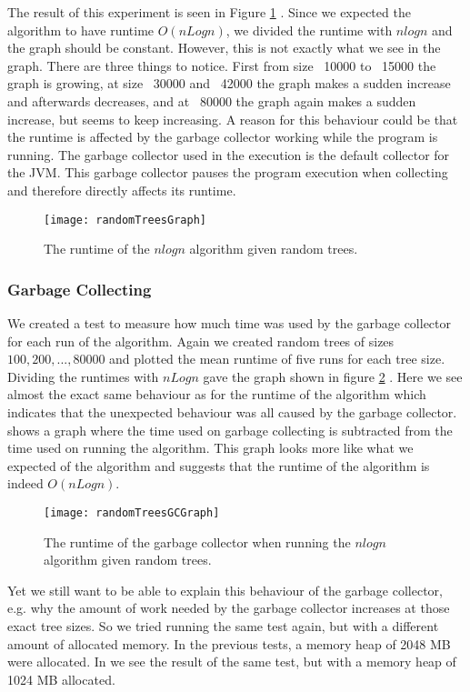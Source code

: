 The result of this experiment is seen in Figure \ref{randomTreesGraph} . Since we expected the algorithm to have runtime $O(nLogn)$, we divided the runtime with $nlogn$ and the graph should be constant. However, this is not exactly what we see in the graph. There are three things to notice. First from size ~10000 to ~15000 the graph is growing, at size ~30000 and ~42000 the graph makes a sudden increase and afterwards decreases, and at ~80000 the graph again makes a sudden increase, but seems to keep increasing. A reason for this behaviour could be that the runtime is affected by the garbage collector working while the program is running. The garbage collector used in the execution is the default collector for the JVM. This garbage collector pauses the program execution when collecting and therefore directly affects its runtime.

\begin{figure}
	\label{randomTreesGraph}
	\texttt{[image: randomTreesGraph]}
	\caption{The runtime of the $nlogn$ algorithm given random trees.}
\end{figure}

\subsubsection{Garbage Collecting}
We created a test to measure how much time was used by the garbage collector for each run of the algorithm. Again we created random trees of sizes $100, 200, ..., 80000$ and plotted the mean runtime of five runs for each tree size. Dividing the runtimes with $nLogn$ gave the graph shown in figure \ref{randomTreesGCGraph} . Here we see almost the exact same behaviour as for the runtime of the algorithm which indicates that the unexpected behaviour was all caused by the garbage collector.  shows a graph where the time used on garbage collecting is subtracted from the time used on running the algorithm. This graph looks more like what we expected of the algorithm and suggests that the runtime of the algorithm is indeed $O(nLogn)$.

\begin{figure}
	\label{randomTreesGCGraph}
	\texttt{[image: randomTreesGCGraph]}
	\caption{The runtime of the garbage collector when running the $nlogn$ algorithm given random trees.}
\end{figure}

Yet we still want to be able to explain this behaviour of the garbage collector, e.g. why the amount of work needed by the garbage collector increases at those exact tree sizes. So we tried running the same test again, but with a different amount of allocated memory. In the previous tests, a memory heap of 2048 MB were allocated. In  we see the result of the same test, but with a memory heap of 1024 MB allocated. 

